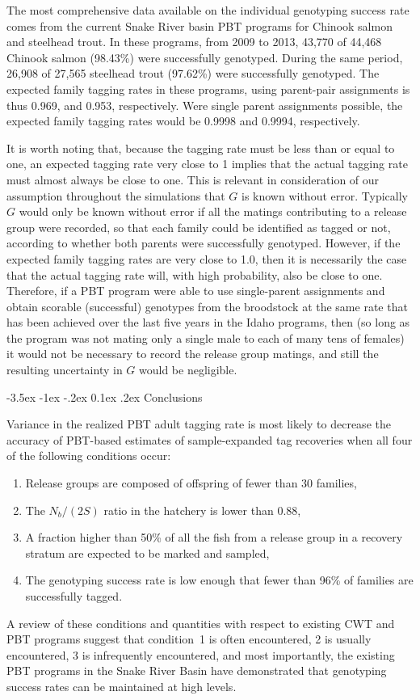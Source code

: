\documentclass[11pt]{article}
\makeatletter
\renewcommand\section{\@startsection {section}{1}{\z@}%
                                   {-3.5ex \@plus -1ex \@minus -.2ex}%
                                   {0.1ex \@plus.2ex}%
                                   {\normalfont\large\bfseries}}
\makeatother
\begin{document}
The most comprehensive data available on the individual genotyping success rate comes
from the current Snake River basin PBT programs for Chinook salmon and steelhead trout.
In these programs, from 2009 to 2013, 43,770 of 44,468 Chinook salmon (98.43\%) were
successfully genotyped. During the same period, 26,908 of 27,565 steelhead trout (97.62\%)
were successfully genotyped. The expected family tagging rates in these programs, using parent-pair assignments
is thus 0.969, and 0.953, respectively. Were single parent assignments possible,
the expected family tagging rates would be 0.9998 and 0.9994, respectively.

It is worth noting that, because the tagging rate must be less than or equal to one, an expected tagging rate very 
close to 1 implies that the actual tagging rate must almost always be close to one.  
This is relevant in consideration of our assumption
throughout the simulations that $G$ is known without error. Typically $G$ would only be known without error if all the
matings contributing to a release group were recorded, so that each family could be identified as tagged or not, according to
whether both parents were successfully genotyped.
However, if the expected family tagging rates are very close to 1.0, then it is necessarily the case that
the actual tagging rate will, with high probability, also be 
close to one. Therefore, if a PBT program were able to use single-parent assignments and
obtain scorable (successful) genotypes from the
broodstock at the same rate that has been achieved over the last five years in the Idaho programs, then
(so long as the program was not mating only a single male to each of many tens of females) it would not be necessary
to record the release group matings, and still the
resulting uncertainty in $G$ would be negligible.



\section{Conclusions}

Variance in the realized PBT adult tagging rate is most likely to decrease the accuracy
of PBT-based estimates of sample-expanded tag recoveries when all four of the following conditions occur:
\begin{enumerate}
\item Release groups are composed of offspring of fewer than 30 families,
\item The $N_b/(2S)$ ratio in the hatchery is lower than 0.88,
\item A fraction higher than 50\% of all the fish from a release group in a recovery stratum are expected to be marked and sampled,
\item The genotyping success rate is low enough that fewer than 96\% of families are successfully tagged.
\end{enumerate}
A review of these conditions and quantities with respect to existing CWT and PBT programs suggest that condition~1 is often encountered, 2 is usually encountered, 3 is infrequently 
encountered, and most importantly, the existing PBT programs in the Snake River Basin have demonstrated that genotyping success rates can be maintained 
at high levels.
\end{document}
